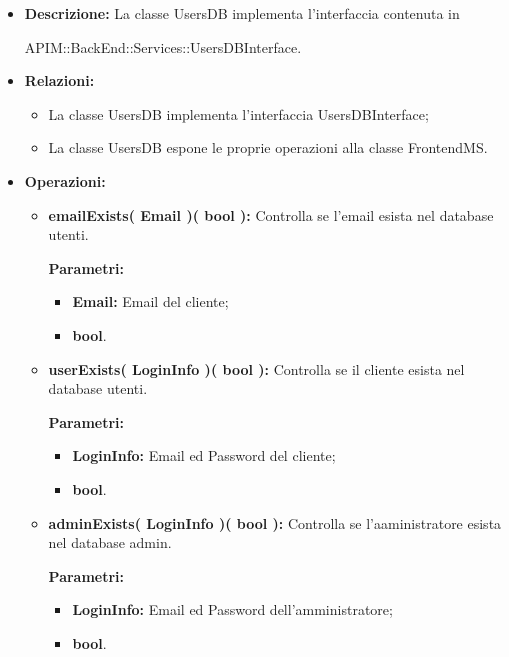 \begin{itemize}
	\item \textbf{Descrizione:} La classe UsersDB implementa l'interfaccia contenuta in 
	\begin{minipage}{\linewidth}
			APIM::BackEnd::Services::UsersDBInterface.
	\end{minipage}

	
	\item \textbf{Relazioni:}
		\begin{itemize}
			\item La classe UsersDB implementa l'interfaccia UsersDBInterface;
			\item La classe UsersDB espone le proprie operazioni alla classe FrontendMS.
		\end{itemize}
	\item \textbf{Operazioni:}
		\begin{itemize}
		
			\item \textbf{emailExists( Email )( bool ):} Controlla se l'email esista nel database utenti.
				\begin{description}
					\item[\textbf{Parametri:}]
				\end{description}
				\begin{itemize}
					\item \textbf{Email:} Email del cliente;
					\item \textbf{bool}.
				\end{itemize}
		
			\item \textbf{userExists( LoginInfo )( bool ):} Controlla se il cliente esista nel database utenti.
				\begin{description}
    				\item[\textbf{Parametri:}]
				\end{description}
				\begin{itemize}
					\item \textbf{LoginInfo:} Email ed Password del cliente;
					\item \textbf{bool}.
				\end{itemize}
			
			\item \textbf{adminExists( LoginInfo )( bool ):} Controlla se l'aaministratore esista nel database admin.
				\begin{description}
					\item[\textbf{Parametri:}]
				\end{description}
				\begin{itemize}
					\item \textbf{LoginInfo:} Email ed Password dell'amministratore;
					\item \textbf{bool}.
				\end{itemize}


\end{itemize}
\end{itemize}
